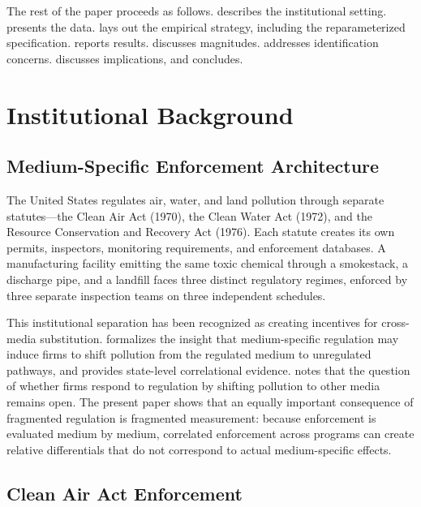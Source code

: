 \documentclass[12pt]{article}
\begin{document}
The rest of the paper proceeds as follows.  describes the institutional setting.  presents the data.  lays out the empirical strategy, including the reparameterized specification.  reports results.  discusses magnitudes.  addresses identification concerns.  discusses implications, and  concludes.


\section{Institutional Background}
\label{sec:background}

\subsection{Medium-Specific Enforcement Architecture}

The United States regulates air, water, and land pollution through separate statutes---the Clean Air Act (1970), the Clean Water Act (1972), and the Resource Conservation and Recovery Act (1976). Each statute creates its own permits, inspectors, monitoring requirements, and enforcement databases. A manufacturing facility emitting the same toxic chemical through a smokestack, a discharge pipe, and a landfill faces three distinct regulatory regimes, enforced by three separate inspection teams on three independent schedules.

This institutional separation has been recognized as creating incentives for cross-media substitution. \citet{sigman1996crossmedia} formalizes the insight that medium-specific regulation may induce firms to shift pollution from the regulated medium to unregulated pathways, and \citet{sigman2001crossmedia} provides state-level correlational evidence. \citet{greenstone2012does} notes that the question of whether firms respond to regulation by shifting pollution to other media remains open. The present paper shows that an equally important consequence of fragmented regulation is fragmented measurement: because enforcement is evaluated medium by medium, correlated enforcement across programs can create relative differentials that do not correspond to actual medium-specific effects.

\subsection{Clean Air Act Enforcement}
\end{document}
